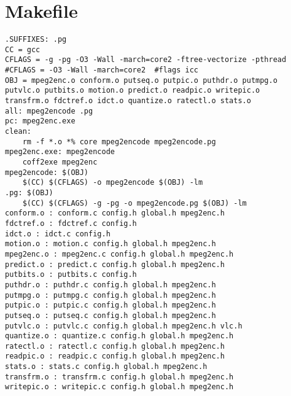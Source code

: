 \appendix
\chapter{Makefile}
\begin{lstlisting}
.SUFFIXES: .pg
CC = gcc
CFLAGS = -g -pg -O3 -Wall -march=core2 -ftree-vectorize -pthread
#CFLAGS = -O3 -Wall -march=core2  #flags icc
OBJ = mpeg2enc.o conform.o putseq.o putpic.o puthdr.o putmpg.o 
putvlc.o putbits.o motion.o predict.o readpic.o writepic.o 
transfrm.o fdctref.o idct.o quantize.o ratectl.o stats.o
all: mpeg2encode .pg
pc: mpeg2enc.exe
clean:
	rm -f *.o *% core mpeg2encode mpeg2encode.pg
mpeg2enc.exe: mpeg2encode
	coff2exe mpeg2enc
mpeg2encode: $(OBJ)
	$(CC) $(CFLAGS) -o mpeg2encode $(OBJ) -lm
.pg: $(OBJ)
	$(CC) $(CFLAGS) -g -pg -o mpeg2encode.pg $(OBJ) -lm
conform.o : conform.c config.h global.h mpeg2enc.h 
fdctref.o : fdctref.c config.h 
idct.o : idct.c config.h 
motion.o : motion.c config.h global.h mpeg2enc.h 
mpeg2enc.o : mpeg2enc.c config.h global.h mpeg2enc.h 
predict.o : predict.c config.h global.h mpeg2enc.h 
putbits.o : putbits.c config.h 
puthdr.o : puthdr.c config.h global.h mpeg2enc.h 
putmpg.o : putmpg.c config.h global.h mpeg2enc.h 
putpic.o : putpic.c config.h global.h mpeg2enc.h 
putseq.o : putseq.c config.h global.h mpeg2enc.h 
putvlc.o : putvlc.c config.h global.h mpeg2enc.h vlc.h 
quantize.o : quantize.c config.h global.h mpeg2enc.h 
ratectl.o : ratectl.c config.h global.h mpeg2enc.h 
readpic.o : readpic.c config.h global.h mpeg2enc.h 
stats.o : stats.c config.h global.h mpeg2enc.h 
transfrm.o : transfrm.c config.h global.h mpeg2enc.h 
writepic.o : writepic.c config.h global.h mpeg2enc.h 
\end{lstlisting}

